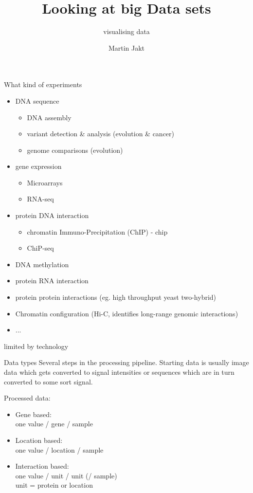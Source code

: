\documentclass[pdf]{beamer}
\title{Looking at big Data sets}
\subtitle{visualising data}
\author{Martin Jakt}
\begin{document}
\begin{frame}
\titlepage
\end{frame}

\begin{frame}{What kind of experiments}
  \begin{itemize}
    \small
  \item DNA sequence
    \begin{itemize}
      \footnotesize
    \item DNA assembly
    \item variant detection \& analysis (evolution \& cancer)
    \item genome comparisons (evolution)
    \end{itemize}
  \item gene expression
    \begin{itemize}
      \footnotesize
    \item Microarrays
    \item RNA-seq
    \end{itemize}
  \item protein DNA interaction
    \begin{itemize}
      \footnotesize
    \item chromatin Immuno-Precipitation (ChIP) - chip
    \item ChiP-seq
    \end{itemize}
  \item DNA methylation
  \item protein RNA interaction
  \item protein protein interactions (eg. high throughput yeast two-hybrid)
  \item Chromatin configuration (Hi-C, identifies long-range genomic interactions)
  \item ...
  \end{itemize}
  
  \small limited by technology
\end{frame}

\begin{frame}{Data types}
  Several steps in the processing pipeline. Starting data is usually image data
  which gets converted to signal intensities or sequences which are in turn
  converted to some sort signal.

  Processed data:
  \begin{itemize}
  \item Gene based:\\
    one value / gene / sample
  \item Location based:\\
    one value / location / sample
  \item Interaction based:\\
    one value / unit / unit (/ sample)\\
    unit = protein or location 
  \end{itemize}
\end{frame}
\end{document}
